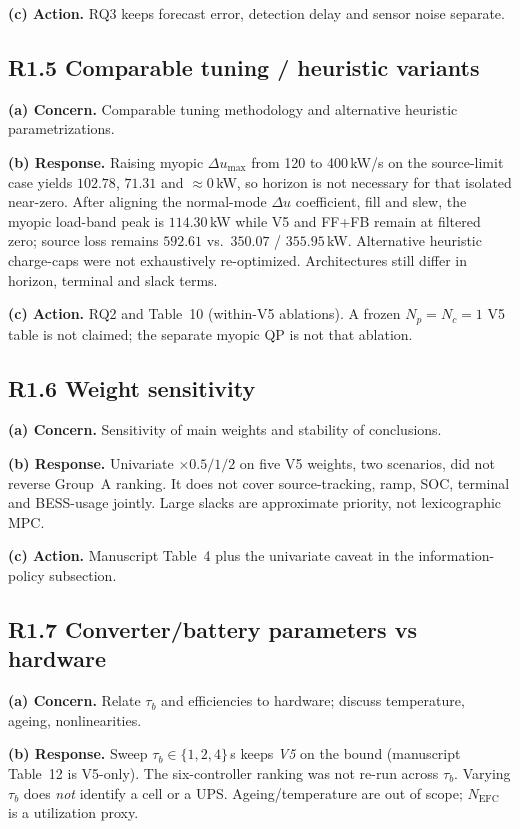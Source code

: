 \documentclass[11pt]{article}
\begin{document}
\textbf{(c) Action.} RQ3 keeps forecast error, detection delay and sensor noise separate.

\subsection*{R1.5 Comparable tuning / heuristic variants}
\textbf{(a) Concern.} Comparable tuning methodology and alternative heuristic parametrizations.

\textbf{(b) Response.} Raising myopic $\Delta u_{\max}$ from 120 to 400\,kW/s on the source-limit case yields $102.78$, $71.31$ and $\approx 0$\,kW, so horizon is not necessary for that isolated near-zero. After aligning the normal-mode $\Delta u$ coefficient, fill and slew, the myopic load-band peak is $114.30$\,kW while V5 and FF+FB remain at filtered zero; source loss remains $592.61$ vs.\ $350.07$ / $355.95$\,kW. Alternative heuristic charge-caps were not exhaustively re-optimized. Architectures still differ in horizon, terminal and slack terms.

\textbf{(c) Action.} RQ2 and Table~10 (within-V5 ablations). A frozen $N_p=N_c=1$ V5 table is not claimed; the separate myopic QP is not that ablation.

\subsection*{R1.6 Weight sensitivity}
\textbf{(a) Concern.} Sensitivity of main weights and stability of conclusions.

\textbf{(b) Response.} Univariate $\times 0.5/1/2$ on five V5 weights, two scenarios, did not reverse Group~A ranking. It does not cover source-tracking, ramp, SOC, terminal and BESS-usage jointly. Large slacks are approximate priority, not lexicographic MPC.

\textbf{(c) Action.} Manuscript Table~4 plus the univariate caveat in the information-policy subsection.

\subsection*{R1.7 Converter/battery parameters vs hardware}
\textbf{(a) Concern.} Relate $\tau_b$ and efficiencies to hardware; discuss temperature, ageing, nonlinearities.

\textbf{(b) Response.} Sweep $\tau_b\in\{1,2,4\}$\,s keeps \emph{V5} on the bound (manuscript Table~12 is V5-only). The six-controller ranking was not re-run across $\tau_b$. Varying $\tau_b$ does \emph{not} identify a cell or a UPS. Ageing/temperature are out of scope; $N_{\mathrm{EFC}}$ is a utilization proxy.
\end{document}
